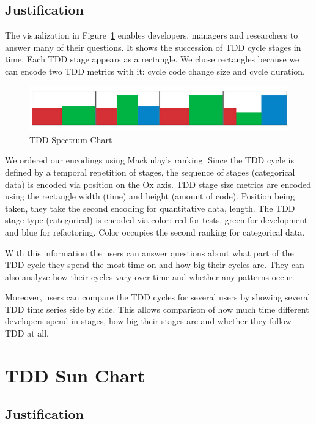 \documentclass[journal]{vgtc}                %
\begin{document}
\subsection{Justification}

The visualization in Figure~\ref{fig:two} enables developers, managers and researchers to answer many of their questions. It shows the succession of TDD cycle stages in time. Each TDD stage appears as a rectangle. We chose rectangles because we can encode two TDD metrics with it: cycle code change size and cycle duration.

\begin{figure}
	\includegraphics[width=\textwidth]{fig2.png}
	\caption{TDD Spectrum Chart}
	\label{fig:two}
\end{figure}

We ordered our encodings using Mackinlay's ranking.
Since the TDD cycle is defined by a temporal repetition of stages, the sequence of stages (categorical data) is encoded via position on the Ox axis.
TDD stage size metrics are encoded using the rectangle width (time) and height (amount of code). Position being taken, they take the second encoding for quantitative data, length.
The TDD stage type (categorical) is encoded via color: red for tests, green for development and blue for refactoring. Color occupies the second ranking for categorical data.

With this information the users can answer questions about what part of the TDD cycle they spend the most time on and how big their cycles are. They can also analyze how their cycles vary over time and whether any patterns occur.

Moreover, users can compare the TDD cycles for several users by showing several TDD time series side by side. This allows comparison of how much time different developers spend in stages, how big their stages are and whether they follow TDD at all.

\section{TDD Sun Chart}
\label{sec:pulse}

\subsection{Justification}
\end{document}
